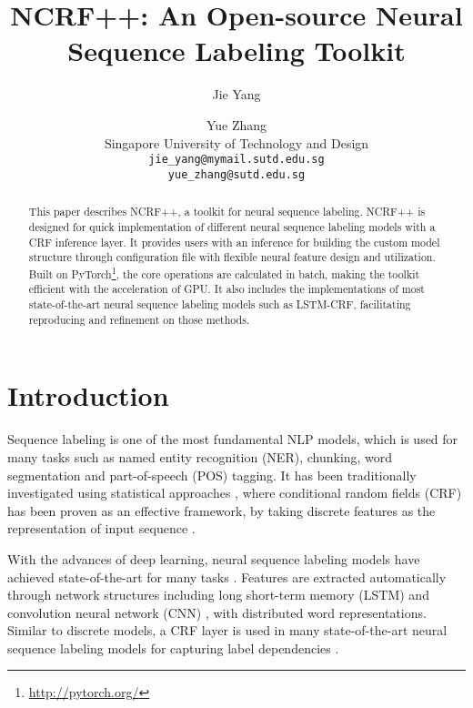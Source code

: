 \documentclass[11pt,a4paper]{article}
\title{\textbf{\textsc{NCRF++}: An Open-source Neural Sequence Labeling Toolkit}}
\author{Jie Yang \and Yue Zhang \\
  Singapore University of Technology and Design\\
  {\tt jie\_yang@mymail.sutd.edu.sg} \\
  {\tt yue\_zhang@sutd.edu.sg} \\
  }
\date{}
\begin{document}
\maketitle
\begin{abstract}
  This paper describes NCRF++, a toolkit for neural sequence labeling. NCRF++ is designed for quick implementation of different neural sequence labeling models with a CRF inference layer. It provides users with an inference for building the custom model structure through configuration file with flexible neural feature design and utilization. Built on PyTorch\footnote{\url{http://pytorch.org/}}, the core operations are calculated in batch, making the toolkit efficient with the acceleration of GPU. It also includes the implementations of most state-of-the-art neural sequence labeling models such as LSTM-CRF, facilitating reproducing and refinement on those methods. 
\end{abstract}

\section{Introduction}

Sequence labeling is one of the most fundamental NLP models, which is used for many tasks such as named entity recognition (NER), chunking, word segmentation and part-of-speech (POS) tagging. It has been traditionally investigated using statistical approaches \cite{lafferty2001conditional,ratinov2009design}, where conditional random fields (CRF) \cite{lafferty2001conditional} has been proven as an effective framework, by taking discrete features as the representation of input sequence \cite{sha2003shallow,keerthi2007crf}. 

With the advances of deep learning, neural sequence labeling models have achieved state-of-the-art for many tasks \cite{ling2015finding,ma2016end,peters2017semi}. Features are extracted automatically through network structures including long short-term memory (LSTM) \cite{hochreiter1997long} and convolution neural network (CNN) \cite{lecun1989backpropagation}, with distributed word representations. Similar to discrete models, a CRF layer is used in many state-of-the-art neural sequence labeling models for capturing label dependencies \cite{collobert2011natural,lample2016neural,peters2017semi}. 
\end{document}
